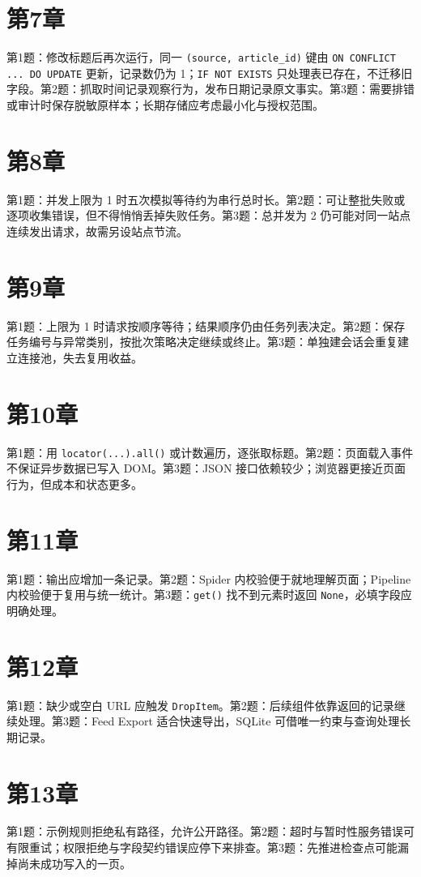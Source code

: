 \section*{第7章}
第1题：修改标题后再次运行，同一 \texttt{(source, article\_id)} 键由 \texttt{ON CONFLICT ... DO UPDATE} 更新，记录数仍为 1；\texttt{IF NOT EXISTS} 只处理表已存在，不迁移旧字段。第2题：抓取时间记录观察行为，发布日期记录原文事实。第3题：需要排错或审计时保存脱敏原样本；长期存储应考虑最小化与授权范围。

\section*{第8章}
第1题：并发上限为 1 时五次模拟等待约为串行总时长。第2题：可让整批失败或逐项收集错误，但不得悄悄丢掉失败任务。第3题：总并发为 2 仍可能对同一站点连续发出请求，故需另设站点节流。

\section*{第9章}
第1题：上限为 1 时请求按顺序等待；结果顺序仍由任务列表决定。第2题：保存任务编号与异常类别，按批次策略决定继续或终止。第3题：单独建会话会重复建立连接池，失去复用收益。

\section*{第10章}
第1题：用 \texttt{locator(...).all()} 或计数遍历，逐张取标题。第2题：页面载入事件不保证异步数据已写入 DOM。第3题：JSON 接口依赖较少；浏览器更接近页面行为，但成本和状态更多。

\section*{第11章}
第1题：输出应增加一条记录。第2题：Spider 内校验便于就地理解页面；Pipeline 内校验便于复用与统一统计。第3题：\texttt{get()} 找不到元素时返回 \texttt{None}，必填字段应明确处理。

\section*{第12章}
第1题：缺少或空白 URL 应触发 \texttt{DropItem}。第2题：后续组件依靠返回的记录继续处理。第3题：Feed Export 适合快速导出，SQLite 可借唯一约束与查询处理长期记录。

\section*{第13章}
第1题：示例规则拒绝私有路径，允许公开路径。第2题：超时与暂时性服务错误可有限重试；权限拒绝与字段契约错误应停下来排查。第3题：先推进检查点可能漏掉尚未成功写入的一页。

